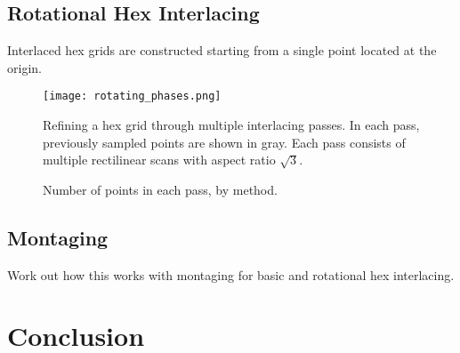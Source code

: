 \documentclass{article}
\begin{document}
\subsection{Rotational Hex Interlacing}
\label{triple-grid-interlacing}

Interlaced hex grids are constructed starting from a single point
located at the origin.

\begin{figure}[ht]
\centering
\texttt{[image: rotating\_phases.png]}
\caption{
\label{fig:rotatingphases} Refining a hex grid through multiple interlacing passes.
%
In each pass, previously sampled points are shown in gray.
%
Each pass consists of multiple rectilinear scans with aspect ratio $\sqrt{3}$.
}
\end{figure}

\begin{figure}[ht]
\caption{\label{fig:passsizes} Number of points in each pass, by method.}
\end{figure}

\subsection{Montaging}
\label{sec:montaging}

Work out how this works with montaging for basic and rotational hex interlacing.

\section{Conclusion}
\label{sec:conclusion}



\end{document}
